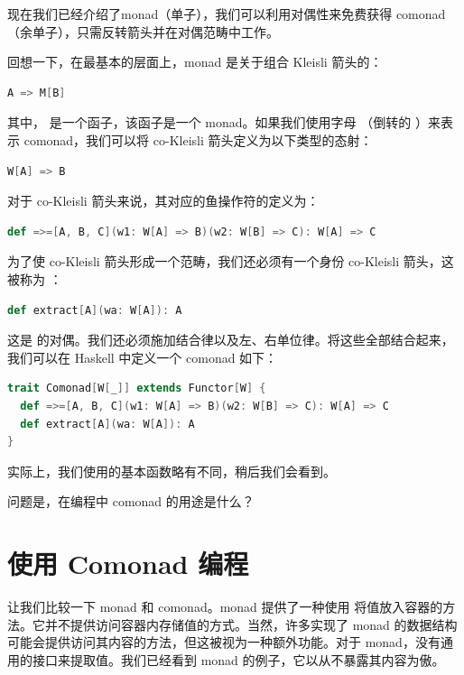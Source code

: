 
\lettrine[lhang=0.17]{现}{在我们已经介绍了}monad（单子），我们可以利用对偶性来免费获得 comonad（余单子），只需反转箭头并在对偶范畴中工作。

回想一下，在最基本的层面上，monad 是关于组合 Kleisli 箭头的：

\begin{lstlisting}[language=Scala]
A => M[B]
\end{lstlisting}
其中， 是一个函子，该函子是一个 monad。如果我们使用字母 （倒转的 ）来表示 comonad，我们可以将 co-Kleisli 箭头定义为以下类型的态射：

\begin{lstlisting}[language=Scala]
W[A] => B
\end{lstlisting}
对于 co-Kleisli 箭头来说，其对应的鱼操作符的定义为：

\begin{lstlisting}[language=Scala]
def =>=[A, B, C](w1: W[A] => B)(w2: W[B] => C): W[A] => C

\end{lstlisting}
为了使 co-Kleisli 箭头形成一个范畴，我们还必须有一个身份 co-Kleisli 箭头，这被称为 ：

\begin{lstlisting}[language=Scala]
def extract[A](wa: W[A]): A
\end{lstlisting}
这是  的对偶。我们还必须施加结合律以及左、右单位律。将这些全部结合起来，我们可以在 Haskell 中定义一个 comonad 如下：

\begin{lstlisting}[language=Scala]
trait Comonad[W[_]] extends Functor[W] {
  def =>=[A, B, C](w1: W[A] => B)(w2: W[B] => C): W[A] => C
  def extract[A](wa: W[A]): A
}
\end{lstlisting}
实际上，我们使用的基本函数略有不同，稍后我们会看到。

问题是，在编程中 comonad 的用途是什么？

\section{使用 Comonad 编程}

让我们比较一下 monad 和 comonad。monad 提供了一种使用  将值放入容器的方法。它并不提供访问容器内存储值的方式。当然，许多实现了 monad 的数据结构可能会提供访问其内容的方法，但这被视为一种额外功能。对于 monad，没有通用的接口来提取值。我们已经看到  monad 的例子，它以从不暴露其内容为傲。

